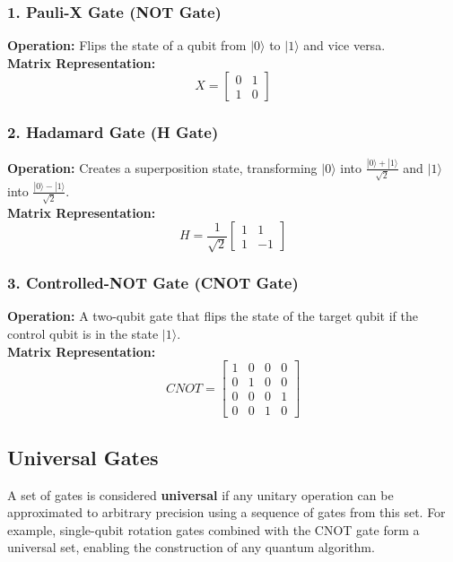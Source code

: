 \documentclass[11pt]{article}
\theoremstyle{definition}
\begin{document}
\subsubsection*{1. Pauli-X Gate (NOT Gate)}
\textbf{Operation:} Flips the state of a qubit from $|0\rangle$ to $|1\rangle$ and vice versa. \\
\textbf{Matrix Representation:}
\[
X = 
\begin{bmatrix}
0 & 1 \\
1 & 0
\end{bmatrix}
\]

\subsubsection*{2. Hadamard Gate (H Gate)}
\textbf{Operation:} Creates a superposition state, transforming $|0\rangle$ into $\frac{|0\rangle + |1\rangle}{\sqrt{2}}$ and $|1\rangle$ into $\frac{|0\rangle - |1\rangle}{\sqrt{2}}$. \\
\textbf{Matrix Representation:}
\[
H = \frac{1}{\sqrt{2}}
\begin{bmatrix}
1 & 1 \\
1 & -1
\end{bmatrix}
\]

\subsubsection*{3. Controlled-NOT Gate (CNOT Gate)}
\textbf{Operation:} A two-qubit gate that flips the state of the target qubit if the control qubit is in the state $|1\rangle$. \\
\textbf{Matrix Representation:}
\[
CNOT =
\begin{bmatrix}
1 & 0 & 0 & 0 \\
0 & 1 & 0 & 0 \\
0 & 0 & 0 & 1 \\
0 & 0 & 1 & 0
\end{bmatrix}
\]


\subsection*{Universal Gates}
A set of gates is considered \textbf{universal} if any unitary operation can be approximated to arbitrary precision using a sequence of gates from this set. For example, single-qubit rotation gates combined with the CNOT gate form a universal set, enabling the construction of any quantum algorithm.

\end{document}
